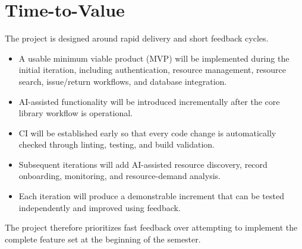 \documentclass[11pt,a4paper]{article}
\begin{document}
\section{Time-to-Value}
The project is designed around rapid delivery and short feedback cycles.
\begin{itemize}
    \item A usable minimum viable product (MVP) will be implemented during the initial iteration, including authentication, resource management, resource search, issue/return workflows, and database integration.
    \item AI-assisted functionality will be introduced incrementally after the core library workflow is operational.
    \item CI will be established early so that every code change is automatically checked through linting, testing, and build validation.
    \item Subsequent iterations will add AI-assisted resource discovery, record onboarding, monitoring, and resource-demand analysis.
    \item Each iteration will produce a demonstrable increment that can be tested independently and improved using feedback.
\end{itemize}
The project therefore prioritizes fast feedback over attempting to implement the complete feature set at the beginning of the semester.
\end{document}
